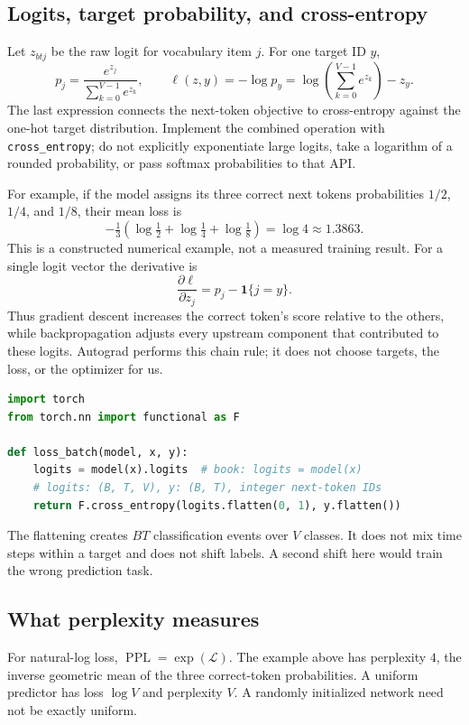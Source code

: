 \subsection{Logits, target probability, and cross-entropy}
Let $z_{btj}$ be the raw logit for vocabulary item $j$. For one target ID $y$,
\[
p_j=\frac{e^{z_j}}{\sum_{k=0}^{V-1}e^{z_k}},\qquad
\ell(z,y)=-\log p_y
=\log\left(\sum_{k=0}^{V-1}e^{z_k}\right)-z_y.
\]
The last expression connects the next-token objective to cross-entropy against
the one-hot target distribution. Implement the combined operation with
\texttt{cross\_entropy}; do not explicitly exponentiate large logits, take a
logarithm of a rounded probability, or pass softmax probabilities to that API.

For example, if the model assigns its three correct next tokens probabilities
$1/2$, $1/4$, and $1/8$, their mean loss is
\[
-\tfrac13\left(\log\tfrac12+\log\tfrac14+\log\tfrac18\right)
=\log4\approx1.3863.
\]
This is a constructed numerical example, not a measured training result.
For a single logit vector the derivative is
\[
\frac{\partial\ell}{\partial z_j}=p_j-\mathbf1\{j=y\}.
\]
Thus gradient descent increases the correct token's score relative to the
others, while backpropagation adjusts every upstream component that contributed
to these logits. Autograd performs this chain rule; it does not choose targets,
the loss, or the optimizer for us.

\begin{lstlisting}[language=Python]
import torch
from torch.nn import functional as F

def loss_batch(model, x, y):
    logits = model(x).logits  # book: logits = model(x)
    # logits: (B, T, V), y: (B, T), integer next-token IDs
    return F.cross_entropy(logits.flatten(0, 1), y.flatten())
\end{lstlisting}
The flattening creates $BT$ classification events over $V$ classes. It does
not mix time steps within a target and does not shift labels. A second shift
here would train the wrong prediction task.

\subsection{What perplexity measures}
For natural-log loss, $\operatorname{PPL}=\exp(\mathcal L)$. The example above
has perplexity $4$, the inverse geometric mean of the three correct-token
probabilities. A uniform predictor has loss $\log V$ and perplexity $V$.
A randomly initialized network need not be exactly uniform.

